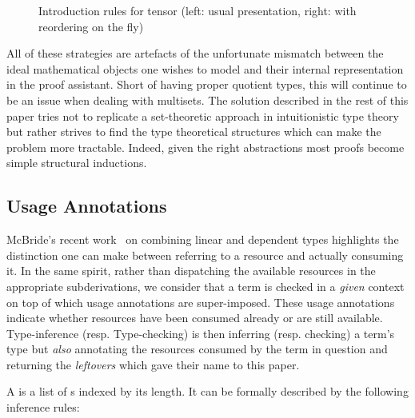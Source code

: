 \documentclass[a4paper,UKenglish]{lipics-v2016}
\begin{document}
\begin{figure}[ht]
\caption{Introduction rules for tensor (left: usual presentation, right: with reordering on the fly)\label{rule:tensor}}
\end{figure}

All of these strategies are artefacts of the unfortunate mismatch
between the ideal mathematical objects one wishes to model and
their internal representation in the proof assistant. Short of
having proper quotient types, this will continue to be an issue
when dealing with multisets. The solution described in the rest
of this paper tries not to replicate a set-theoretic approach in
intuitionistic type theory but rather strives to find the type
theoretical structures which can make the problem more tractable.
Indeed, given the right abstractions most proofs become simple
structural inductions.

\subsection{Usage Annotations}

McBride's recent work~\cite{mcbride2016got} on combining linear and
dependent types highlights the distinction one can make between
referring to a resource and actually consuming it. In the same spirit,
rather than dispatching the available resources in the appropriate
subderivations, we consider that a term is checked in a \emph{given}
context on top of which usage annotations are super-imposed. These
usage annotations indicate whether resources have been consumed already
or are still available. Type-inference (resp. Type-checking) is then
inferring (resp. checking) a term's type but \emph{also} annotating
the resources consumed by the term in question and returning the
\emph{leftovers} which gave their name to this paper.

\begin{definition}
\label{definition:context}
A \Context{} is a list of \Type{}s indexed by its length. It can
be formally described by the following inference rules:
\end{definition}
\end{document}
